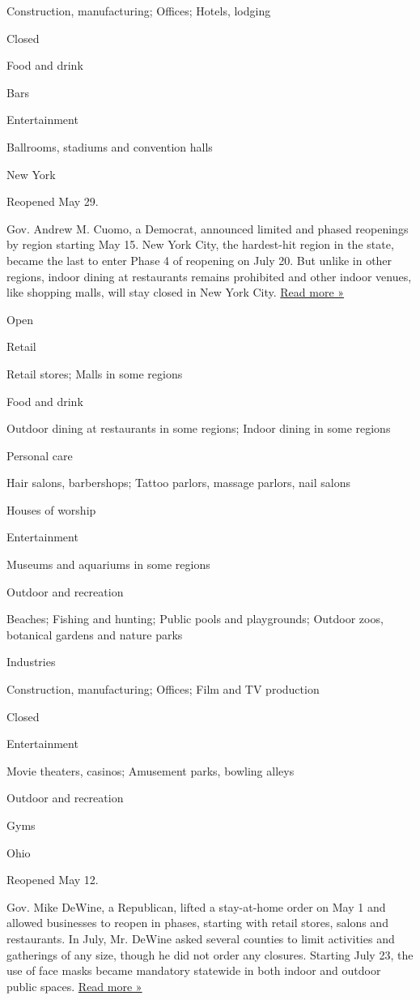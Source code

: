 Construction, manufacturing; Offices; Hotels, lodging

Closed

Food and drink

Bars

Entertainment

Ballrooms, stadiums and convention halls

New York

Reopened May 29.

Gov. Andrew M. Cuomo, a Democrat, announced limited and phased
reopenings by region starting May 15. New York City, the hardest-hit
region in the state, became the last to enter Phase 4 of reopening on
July 20. But unlike in other regions, indoor dining at restaurants
remains prohibited and other indoor venues, like shopping malls, will
stay closed in New York City.
\href{https://www.nytimes.com/2020/07/20/nyregion/nyc-phase-4-reopening-bars.html}{Read
more »}

Open

Retail

Retail stores; Malls in some regions

Food and drink

Outdoor dining at restaurants in some regions; Indoor dining in some
regions

Personal care

Hair salons, barbershops; Tattoo parlors, massage parlors, nail salons

Houses of worship

Entertainment

Museums and aquariums in some regions

Outdoor and recreation

Beaches; Fishing and hunting; Public pools and playgrounds; Outdoor
zoos, botanical gardens and nature parks

Industries

Construction, manufacturing; Offices; Film and TV production

Closed

Entertainment

Movie theaters, casinos; Amusement parks, bowling alleys

Outdoor and recreation

Gyms

Ohio

Reopened May 12.

Gov. Mike DeWine, a Republican, lifted a stay-at-home order on May 1 and
allowed businesses to reopen in phases, starting with retail stores,
salons and restaurants. In July, Mr. DeWine asked several counties to
limit activities and gatherings of any size, though he did not order any
closures. Starting July 23, the use of face masks became mandatory
statewide in both indoor and outdoor public spaces.
\href{https://www.news5cleveland.com/news/state/ohio-gov-mike-dewine-announces-statewide-mask-mandate-effective-thursday}{Read
more »}

